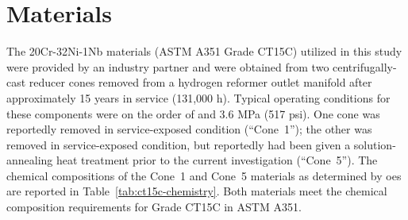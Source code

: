 \chapter{Materials}\label{ch:materials}
The 20Cr-32Ni-1Nb materials (ASTM A351 Grade CT15C) utilized in this study were provided by an industry partner and were obtained from two centrifugally-cast reducer cones removed from a hydrogen reformer outlet manifold after approximately 15 years in service (131,000 h). Typical operating conditions for these components were on the order of  and 3.6 MPa (517 psi).  One cone was reportedly removed in service-exposed condition (``Cone~1''); the other was removed in service-exposed condition, but reportedly had been given a solution-annealing heat treatment prior to the current investigation (``Cone~5''). The chemical compositions of the Cone~1 and Cone~5 materials as determined by \gls{oes} are reported in Table~\ref{tab:ct15c-chemistry}. Both materials meet the chemical composition requirements for Grade CT15C in ASTM A351.

